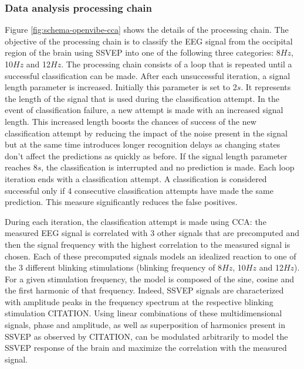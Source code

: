 \documentclass[smallextended]{svjour3}
\begin{document}
\subsubsection{Data analysis processing chain}
Figure \ref{fig:schema-openvibe-cca} shows the details of the processing chain.
The objective of the processing chain is to classify the EEG signal from the occipital region of the brain using SSVEP into one of the following three categories: 8$Hz$, 10$Hz$ and 12$Hz$.
The processing chain consists of a loop that is repeated until a successful classification can be made.
After each unsuccessful iteration, a signal length parameter is increased. Initially this parameter is set to 2$s$.
It represents the length of the signal that is used during the classification attempt.
In the event of classification failure, a new attempt is made with an increased signal length.
This increased length boosts the chances of success of the new classification attempt by reducing the impact of the noise present in the signal
but at the same time introduces longer recognition delays as changing states don't affect the predictions as quickly as before.
If the signal length parameter reaches 8$s$, the classification is interrupted and no prediction is made.
Each loop iteration ends with a classification attempt.
A classification is considered successful only if 4 consecutive classification attempts have made the same prediction. This measure significantly reduces the false positives.

During each iteration, the classification attempt is made using CCA: the measured EEG signal is correlated with 3 other signals that are precomputed and then the signal frequency with the highest correlation to the measured signal is chosen.
Each of these precomputed signals models an idealized reaction to one of the 3 different blinking stimulations (blinking frequency of 8$Hz$, 10$Hz$ and 12$Hz$).
For a given stimulation frequency, the model is composed of the sine, cosine and the first harmonic of that frequency.
Indeed, SSVEP signals are characterized with amplitude peaks in the frequency spectrum at the respective blinking stimulation CITATION.
Using linear combinations of these multidimensional signals, phase and amplitude, as well as superposition of harmonics present in SSVEP as observed by CITATION, can be modulated arbitrarily to model the SSVEP response of the brain and maximize the correlation with the measured signal.
\end{document}
